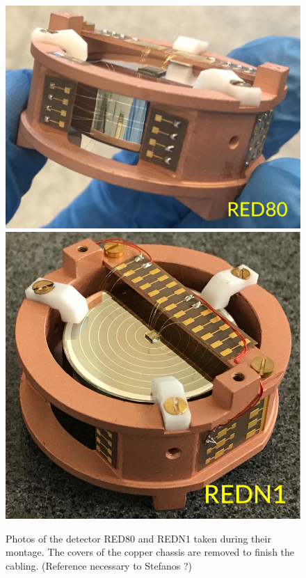 \begin{figure}
\centering
\includegraphics[align=c, scale=0.5]{Figures/ElectrodesExperimental/photo_red80_v2.pdf}
\includegraphics[align=c, scale=0.5]{Figures/ElectrodesExperimental/photo_redn1_v2.pdf}
\caption{Photos of the detector RED80 and REDN1 taken during their montage. The covers of the copper chassis are removed to finish the cabling. (Reference necessary to Stefanos ?)}
\label{fig:photo-redn1-red80}
\end{figure}

